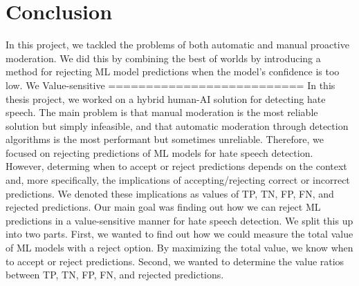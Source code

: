 \chapter{Conclusion}
In this project, we tackled the problems of both automatic and manual proactive moderation.
%
We did this by combining the best of worlds by introducing a method for rejecting ML model predictions when the model's confidence is too low.
%
We 
%
Value-sensitive 
==========================
In this thesis project, we worked on a hybrid human-AI solution for detecting hate speech.
%
The main problem is that manual moderation is the most reliable solution but simply infeasible, and that automatic moderation through detection algorithms is the most performant but sometimes unreliable.
%
Therefore, we focused on rejecting predictions of ML models for hate speech detection.
%
However, determing when to accept or reject predictions depends on the context and, more specifically, the implications of accepting/rejecting correct or incorrect predictions.
%
We denoted these implications as values of TP, TN, FP, FN, and rejected predictions.
%
Our main goal was finding out how we can reject ML predictions in a value-sensitive manner for hate speech detection.
%
We split this up into two parts.
%
First, we wanted to find out how we could measure the total value of ML models with a reject option.
%
By maximizing the total value, we know when to accept or reject predictions.
%
%
Second, we wanted to determine the value ratios between TP, TN, FP, FN, and rejected predictions.
%
%
